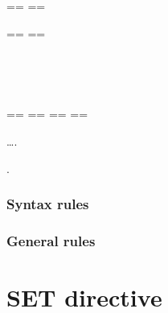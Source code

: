 \begin{syntax}
  \begin{0-1}
  \end{0-1}
  \begin{1=}
    \begin{1=}
      == \pseudotext == \\
      \identifier
    \end{1=}
    \begin{1=}
      == \pseudotext == \\
      \identifier
    \end{1=} \\

    \begin{1=}
       \\
    \end{1=}
    ==  ==
    ==  ==
  \end{1=}\ldots .
\end{syntax}

\begin{syntax}
  \begin{0-1}
  \end{0-1}
  .
\end{syntax}

\subsubsection{Syntax rules}

\subsubsection{General rules}

\section{SET directive}

\begin{syntax}[\miscextcolour]
  \begin{1=}
    \gnucobol{\directiveindicator} \\
    \textdollar
  \end{1=}
  \begin{1=}
     \\

     \\

  \end{1=}
\end{syntax}

